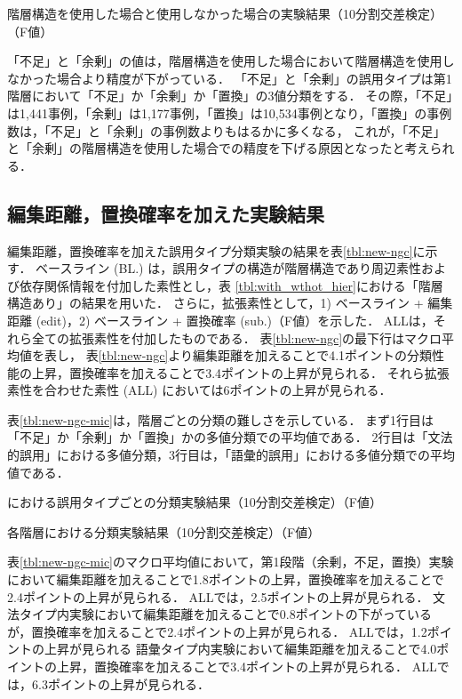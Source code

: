 \documentclass[japanese]{jnlp_1.4}
\newcommand{\ngc}{}
\begin{document}
\begin{table}[t]
\caption{階層構造を使用した場合と使用しなかった場合の実験結果（10分割交差検定）（F値）}
\label{tbl:with_wthot_hier}

\end{table}

「不足」と「余剰」の値は，階層構造を使用した場合において階層構造を使用しなかった場合より精度が下がっている．
「不足」と「余剰」の誤用タイプは第1階層において「不足」か「余剰」か「置換」の3値分類をする．
その際，「不足」は1,441事例，「余剰」は1,177事例，「置換」は10,534事例となり，「置換」の事例数は，「不足」と「余剰」の事例数よりもはるかに多くなる，
これが，「不足」と「余剰」の階層構造を使用した場合での精度を下げる原因となったと考えられる．


\subsection{編集距離，置換確率を加えた実験結果}

編集距離，置換確率を加えた誤用タイプ分類実験の結果を表\ref{tbl:new-ngc}に示す．
ベースライン (BL.) は，誤用タイプの構造が階層構造であり周辺素性および依存関係情報を付加した素性とし，表 \ref{tbl:with_wthot_hier}における「階層構造あり」の結果を用いた．
さらに，拡張素性として，1) ベースライン + 編集距離 (edit)，2) ベースライン + 置換確率 (sub.)（F値）を示した．
ALLは，それら全ての拡張素性を付加したものである．
表\ref{tbl:new-ngc}の最下行はマクロ平均値を表し，
表\ref{tbl:new-ngc}より編集距離を加えることで4.1ポイントの分類性能の上昇，置換確率を加えることで3.4ポイントの上昇が見られる．
それら拡張素性を合わせた素性 (ALL) においては6ポイントの上昇が見られる．

表\ref{tbl:new-ngc-mic}は，階層ごとの分類の難しさを示している．
まず1行目は「不足」か「余剰」か「置換」かの多値分類での平均値である．
2行目は「文法的誤用」における多値分類，3行目は，「語彙的誤用」における多値分類での平均値である．

\begin{table}[t]
\caption{\ngc\hbox{}における誤用タイプごとの分類実験結果（10分割交差検定）（F値）}
\label{tbl:new-ngc}

\end{table}
\begin{table}[t]
\caption{各階層における分類実験結果（10分割交差検定）（F値）}
\label{tbl:new-ngc-mic}

\end{table}

表\ref{tbl:new-ngc-mic}のマクロ平均値において，第1段階（余剰，不足，置換）実験において編集距離を加えることで1.8ポイントの上昇，置換確率を加えることで2.4ポイントの上昇が見られる．
ALLでは，2.5ポイントの上昇が見られる．
文法タイプ内実験において編集距離を加えることで0.8ポイントの下がっているが，置換確率を加えることで2.4ポイントの上昇が見られる．
ALLでは，1.2ポイントの上昇が見られる
語彙タイプ内実験において編集距離を加えることで4.0ポイントの上昇，置換確率を加えることで3.4ポイントの上昇が見られる．
ALLでは，6.3ポイントの上昇が見られる．
\end{document}
